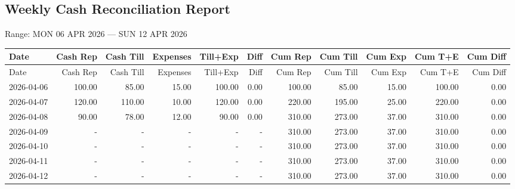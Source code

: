 \documentclass[11pt]{article}
\begin{document}
\begin{landscape}

\section*{Weekly Cash Reconciliation Report}
\noindent
Range: MON 06 APR 2026 --- SUN 12 APR 2026

\bigskip

\footnotesize
\setlength{\LTleft}{0pt}
\setlength{\LTright}{0pt}

\begin{longtable}{p{3.2cm} r r r r r | r r r r r}
\toprule
Date & Cash Rep & Cash Till & Expenses & Till+Exp & Diff & Cum Rep & Cum Till & Cum Exp & Cum T+E & Cum Diff \\
\midrule
\endfirsthead

\toprule
Date & Cash Rep & Cash Till & Expenses & Till+Exp & Diff & Cum Rep & Cum Till & Cum Exp & Cum T+E & Cum Diff \\
\midrule
\endhead

\bottomrule
\endfoot

2026-04-06 & 100.00 & 85.00 & 15.00 & 100.00 & 0.00 & 100.00 & 85.00 & 15.00 & 100.00 & 0.00 \\ \hline
2026-04-07 & 120.00 & 110.00 & 10.00 & 120.00 & 0.00 & 220.00 & 195.00 & 25.00 & 220.00 & 0.00 \\ \hline
2026-04-08 & 90.00 & 78.00 & 12.00 & 90.00 & 0.00 & 310.00 & 273.00 & 37.00 & 310.00 & 0.00 \\ \hline
2026-04-09 & - & - & - & - & - & 310.00 & 273.00 & 37.00 & 310.00 & 0.00 \\ \hline
2026-04-10 & - & - & - & - & - & 310.00 & 273.00 & 37.00 & 310.00 & 0.00 \\ \hline
2026-04-11 & - & - & - & - & - & 310.00 & 273.00 & 37.00 & 310.00 & 0.00 \\ \hline
2026-04-12 & - & - & - & - & - & 310.00 & 273.00 & 37.00 & 310.00 & 0.00 \\ \hline
\end{longtable}

\end{landscape}
\end{document}
